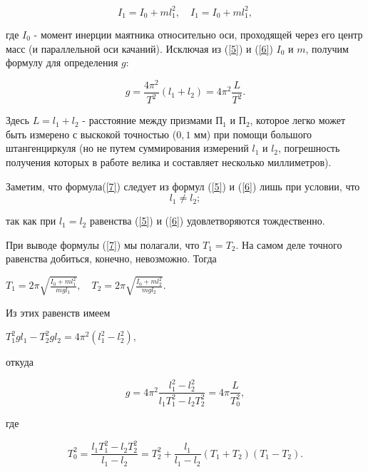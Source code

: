 \documentclass[12pt,a4paper]{article}
\begin{document}
\begin{equation}\label{6}
    I_1 = I_0 + ml_1^2, \quad I_1 = I_0 + ml_1^2,
\end{equation}

где $I_0$ - момент инерции маятника относительно оси, проходящей через его центр масс (и параллельной оси качаний). Исключая из (\ref{5}) и (\ref{6}) $I_0$ и  $m$, получим формулу для определения $g$:

\begin{equation}\label{7}
    g = \frac{4\pi^2}{T^2}(l_1 + l_2) = 4\pi^2\frac{L}{T^2}.
\end{equation}

Здесь $L = l_1 + l_2$ - расстояние между призмами П$_1$ и П$_2$, которое легко может быть измерено с выскокой точностью ($0,1 $ $\textit{мм}$) при помощи большого штангенциркуля (но не путем суммирования измерений $l_1$ и $l_2$, погрешность получения которых в работе велика и составляет несколько миллиметров).

Заметим, что формула(\ref{7}) следует из формул (\ref{5}) и (\ref{6}) лишь при условии, что
\begin{equation}\label{8}
    l_1 \neq l_2;
\end{equation}

так как при $l_1 = l_2$ равенства (\ref{5}) и (\ref{6}) удовлетворяются тождественно.

При выводе формулы (\ref{7}) мы полагали, что $T_1 = T_2$. На самом деле точного равенства добиться, конечно, невозможно. Тогда

\begin{center}
    $T_1 = 2\pi\sqrt{\frac{I_0 + ml_1^2}{mgl_1}}, \quad T_2 = 2\pi\sqrt{\frac{I_0 + ml_2^2}{mgl_2}}.$
\end{center}

Из этих равенств имеем

\begin{center}
    $T_1^2gl_1 - T_2^2gl_2 = 4\pi^2(l_1^2 - l_2^2),$
\end{center}

откуда

\begin{equation}\label{9}
    g = 4\pi^2\frac{l_1^2 - l_2^2}{l_1T_1^2 - l_2T_2^2} = 4\pi\frac{L}{T_0^2},
\end{equation}

где

\begin{equation}\label{10}
    T_0^2 = \frac{l_1T_1^2 - l_2T_2^2}{l_1 - l_2} = T_2^2 + \frac{l_1}{l_1 - l_2}(T_1 + T_2)(T_1 - T_2).
\end{equation}
\end{document}

